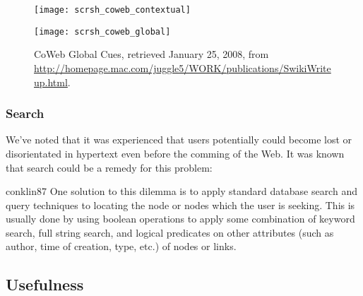 \begin{figure}[b]
  \captionstyle{\raggedright}
  \begin{whole}
    \begin{minipage}[t]{0.475\wholewidth}
      \texttt{[image: scrsh\_coweb\_contextual]}
      \caption[CoWeb Contextual Cues]{%
      CoWeb Contextual Cues,
        retrieved January 25, 2008, from
        \url{http://homepage.mac.com/juggle5/WORK/publications/SwikiWriteup.html}.
      }
      \label{figure:scrsh.coweb.contextual}
    \end{minipage}
    \hfill
    \begin{minipage}[t]{0.475\wholewidth}
      \texttt{[image: scrsh\_coweb\_global]}
      \caption[CoWeb Global Cues]{%
      CoWeb Global Cues,
        retrieved January 25, 2008, from
        \url{http://homepage.mac.com/juggle5/WORK/publications/SwikiWriteup.html}.
      }
      \label{figure:scrsh.coweb.global}
    \end{minipage}
  \end{whole}
  \normalcaption
\end{figure}

\subsubsection{Search}

We've noted that it was experienced that users potentially could become lost
or disorientated in hypertext even before the comming of the Web. It was known
that search could be a remedy for this problem:

\begin{citequote}[p.~38]{conklin87}
  One solution to this dilemma is to apply standard database search and query
  techniques to locating the node or nodes which the user is seeking. This is
  usually done by using boolean operations to apply some combination of
  keyword search, full string search, and logical predicates on other
  attributes (such as author, time of creation, type, etc.) of nodes or links.
\end{citequote}

\subsection{Usefulness}


